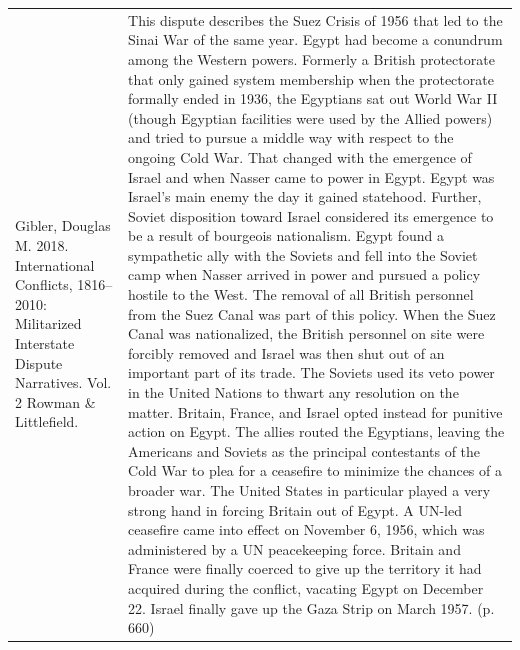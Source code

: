 {\begin{longtable}{p{}p{}}
Gibler, Douglas M. 2018. International Conflicts, 1816–2010: Militarized Interstate Dispute Narratives. Vol. 2 Rowman \& Littlefield. & This dispute describes the Suez Crisis of 1956 that led to the Sinai War of the same year. Egypt had become a conundrum among the Western powers. Formerly a British protectorate that only gained system membership when the protectorate formally ended in 1936, the Egyptians sat out World War II (though Egyptian facilities were used by the Allied powers) and tried to pursue a middle way with respect to the ongoing Cold War. That changed with the emergence of Israel and when Nasser came to power in Egypt. Egypt was Israel's main enemy the day it gained statehood. Further, Soviet disposition toward Israel considered its emergence to be a result of bourgeois nationalism. Egypt found a sympathetic ally with the Soviets and fell into the Soviet camp when Nasser arrived in power and pursued a policy hostile to the West. The removal of all British personnel from the Suez Canal was part of this policy. When the Suez Canal was nationalized, the British personnel on site were forcibly removed and Israel was then shut out of an important part of its trade. The Soviets used its veto power in the United Nations to thwart any resolution on the matter. Britain, France, and Israel opted instead for punitive action on Egypt. The allies routed the Egyptians, leaving the Americans and Soviets as the principal contestants of the Cold War to plea for a ceasefire to minimize the chances of a broader war. The United States in particular played a very strong hand in forcing Britain out of Egypt. A UN-led ceasefire came into effect on November 6, 1956, which was administered by a UN peacekeeping force. Britain and France were finally coerced to give up the territory it had acquired during the conflict, vacating Egypt on December 22. Israel finally gave up the Gaza Strip on March 1957. (p. 660)
\\

\end{longtable}}
